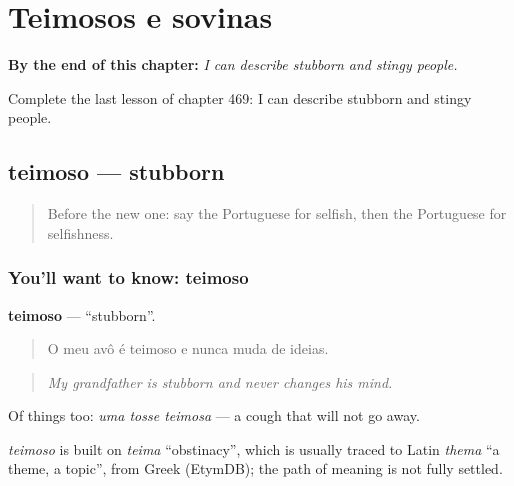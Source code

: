 
\chapter{Teimosos e sovinas}
\label{ch:pt-teimosos-e-sovinas}

\begin{chapteropening}
\textbf{By the end of this chapter:} \emph{I can describe stubborn and stingy people.}

Complete the last lesson of chapter 469: I can describe stubborn and stingy people.
\end{chapteropening}

\section[teimoso]{teimoso — stubborn}

\label{lesson:PT-C469-teimoso}



\begin{quote}
Before the new one: say the Portuguese for selfish, then the Portuguese for selfishness.
\end{quote}

\subsection*{You'll want to know: teimoso}
\textbf{teimoso} — \textquotedblleft{}stubborn\textquotedblright{}.

\begin{quote}
O meu avô é teimoso e nunca muda de ideias.
\end{quote}

\begin{quote}
\emph{My grandfather is stubborn and never changes his mind.}
\end{quote}

Of things too: \emph{uma tosse teimosa} — a cough that will not go away.

\begin{cousinweb}
\emph{teimoso} is built on \emph{teima} \textquotedblleft{}obstinacy\textquotedblright{}, which is usually traced to Latin \emph{thema} \textquotedblleft{}a theme, a topic\textquotedblright{}, from Greek (EtymDB); the path of meaning is not fully settled.
\end{cousinweb}


